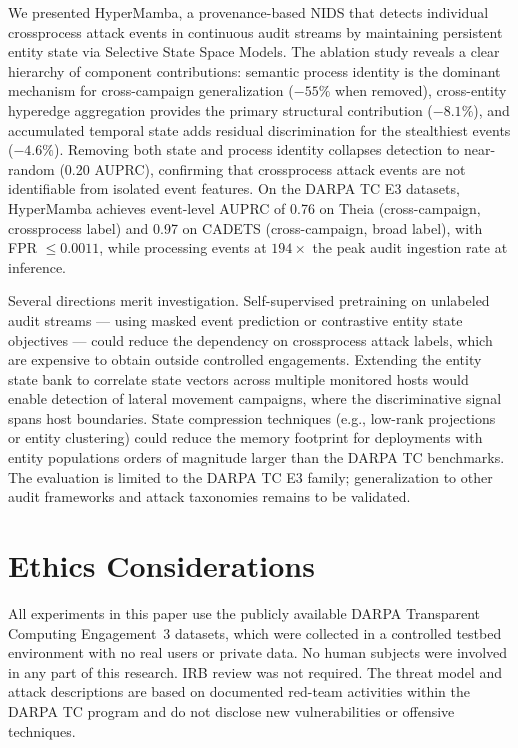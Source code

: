 \documentclass[letterpaper,twocolumn,10pt]{article}
\begin{document}
We presented HyperMamba, a provenance-based NIDS that detects individual crossprocess attack events in continuous audit streams by maintaining persistent entity state via Selective State Space Models. The ablation study reveals a clear hierarchy of component contributions: semantic process identity is the dominant mechanism for cross-campaign generalization ($-55\%$ when removed), cross-entity hyperedge aggregation provides the primary structural contribution ($-8.1\%$), and accumulated temporal state adds residual discrimination for the stealthiest events ($-4.6\%$). Removing both state and process identity collapses detection to near-random (0.20 AUPRC), confirming that crossprocess attack events are not identifiable from isolated event features. On the DARPA TC E3 datasets, HyperMamba achieves event-level AUPRC of 0.76 on Theia (cross-campaign, crossprocess label) and 0.97 on CADETS (cross-campaign, broad label), with FPR $\leq 0.0011$, while processing events at $194\times$ the peak audit ingestion rate at inference.

Several directions merit investigation. Self-supervised pretraining on unlabeled audit streams --- using masked event prediction or contrastive entity state objectives --- could reduce the dependency on crossprocess attack labels, which are expensive to obtain outside controlled engagements. Extending the entity state bank to correlate state vectors across multiple monitored hosts would enable detection of lateral movement campaigns, where the discriminative signal spans host boundaries. State compression techniques (e.g., low-rank projections or entity clustering) could reduce the memory footprint for deployments with entity populations orders of magnitude larger than the DARPA TC benchmarks. The evaluation is limited to the DARPA TC E3 family; generalization to other audit frameworks and attack taxonomies remains to be validated.

\section*{Ethics Considerations}

All experiments in this paper use the publicly available DARPA Transparent Computing Engagement~3 datasets, which were collected in a controlled testbed environment with no real users or private data. No human subjects were involved in any part of this research. IRB review was not required. The threat model and attack descriptions are based on documented red-team activities within the DARPA TC program and do not disclose new vulnerabilities or offensive techniques.
\end{document}
